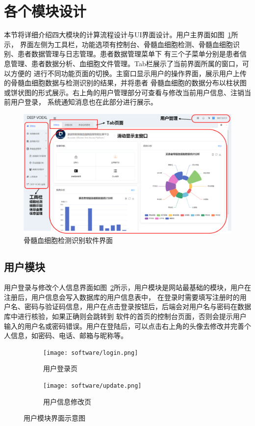 \section{各个模块设计}
本节将详细介绍四大模块的计算流程设计与UI界面设计。用户主界面如图~\ref{fig:interface}所示，
界面左侧为工具栏，功能选项有控制台、骨髓血细胞检测、骨髓血细胞识别、患者数据管理与日志管理。患者数据管理菜单下
有三个子菜单分别是患者信息管理、患者数据分析、血细胞文件管理。Tab栏展示了当前界面所属的窗口，可以方便的
进行不同功能页面的切换。主窗口显示用户的操作界面，展示用户上传的骨髓血细胞数据与检测识别的结果，并将患者
骨髓血细胞的数据分布以柱状图或饼状图的形式展示。右上角的用户管理部分可查看与修改当前用户信息、注销当前用户登录，
系统通知消息也在此部分进行展示。
\begin{figure}[htbp]                     
  \centering                      
  \includegraphics[width=0.99\linewidth]{console.png}                      
  \caption{骨髓血细胞检测识别软件界面}                      
  \label{fig:interface}       
\end{figure}
\subsection{用户模块}
用户登录与修改个人信息界面如图~\ref{fig:software_user}所示，用户模块是网站最基础的模块，用户在注册后，用户信息会写入数据库的用户信息表中，
在登录时需要填写注册时的用户名、密码与验证码信息，用户在点击登录按钮后，后端会对用户名与密码在数据库中进行核验，如果正确则会跳转到
软件的首页的控制台页面，否则会提示用户输入的用户名或密码错误。用户在登陆后，可以点击右上角的头像去修改并完善个人信息，如密码、电话、邮箱与昵称等。
\begin{figure}[htbp]
	\centering
	\begin{subfigure}{0.4\linewidth}
		\centering
		\texttt{[image: software/login.png]}
    \caption{用户登录页}
	\end{subfigure}
	\centering
	\begin{subfigure}{0.40\linewidth}
		\centering
		\texttt{[image: software/update.png]}
    \caption{用户信息修改页}
	\end{subfigure}
  \caption{用户模块界面示意图}
	\label{fig:software_user}
\end{figure}

